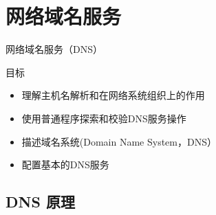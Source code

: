 \section{网络域名服务}

\begin{frame}{网络域名服务（DNS）}

目标
\begin{itemize}
\item 理解主机名解析和在网络系统组织上的作用
\item 使用普通程序探索和校验DNS服务操作
\item 描述域名系统(Domain Name System，DNS）
\item 配置基本的DNS服务
\end{itemize}

\end{frame} 
\subsection{DNS 原理}


